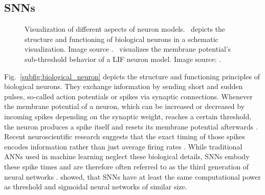 \subsection{\aclp{SNN}}
\label{subsec:SNN}
\begin{figure}[t!]
	\centering
    \caption{Visualization of different aspects of neuron models.~\protect{} depicts the structure and functioning of biological neurons in a schematic visualization. Image source \textcite{Gerstner2002}.~\protect{} visualizes the membrane potential's sub-threshold behavior of a \ac{LIF} neuron model. Image source: \textcite{Masquelier2007}.}
    \label{fig:neuron_models}
\end{figure}

Fig.~\ref{subfig:biological_neuron} depicts the structure and functioning principles of biological neurons.
They  exchange information by sending short and sudden pulses, so-called action potentials or spikes via synaptic connections.
Whenever the membrane potential of a neuron, which can be increased or decreased by incoming spikes depending on the synaptic weight, reaches a certain threshold, the neuron produces a spike itself and resets its membrane potential afterwards \parencite{Gerstner2002, Paugam2009}.
Recent neuroscientific research suggests that the exact timing of those spikes encodes information rather than just average firing rates \parencite{Bohte2004}.
While traditional \acp{ANN} used in machine learning neglect these biological details, \acp{SNN} embody these spike times and are therefore often referred to as the third generation of neural networks \parencite{Maass1997, Paugam2009}.
\textcite{Maass1997} showed, that \acp{SNN} have at least the same computational power as threshold and sigmoidal neural networks of similar size.

